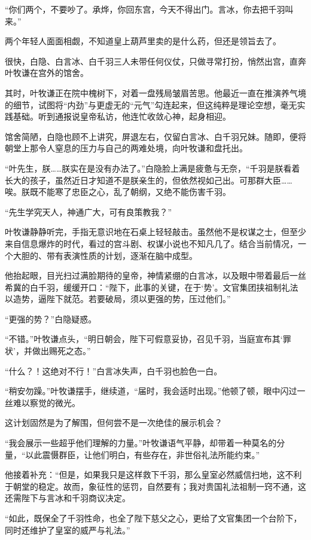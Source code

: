 “你们两个，不要吵了。承烨，你回东宫，今天不得出门。言冰，你去把千羽叫来。”

两个年轻人面面相觑，不知道皇上葫芦里卖的是什么药，但还是领旨去了。

很快，白隐、白言冰、白千羽三人未带任何仪仗，只做寻常打扮，悄然出宫，直奔叶牧谦在宫外的馆舍。

其时，叶牧谦正在院中槐树下，对着一盘残局皱眉苦思。他最近一直在推演养气境的细节，试图将“内劲”与更虚无的“元气”勾连起来，但这纯粹是理论空想，毫无实践基础。听到通报说皇帝私访，他连忙收敛心神，起身相迎。

馆舍简陋，白隐也顾不上讲究，屏退左右，仅留白言冰、白千羽兄妹。随即，便将朝堂上那令人窒息的压力与自己的两难处境，向叶牧谦和盘托出。

“叶先生，朕……朕实在是没有办法了。”白隐脸上满是疲惫与无奈，“千羽是朕看着长大的孩子，虽然近日才知道不是朕亲生的，但依然视如己出。可那群大臣……唉。朕既不能寒了忠臣之心，乱了朝纲，又绝不能伤害千羽。

“先生学究天人，神通广大，可有良策教我？”

叶牧谦静静听完，手指无意识地在石桌上轻轻敲击。虽然他不是权谋之士，但至少来自信息爆炸的时代，看过的宫斗剧、权谋小说也不知凡几了。结合当前情况，一个大胆的、带有表演性质的计划，逐渐在脑中成型。

他抬起眼，目光扫过满脸期待的皇帝，神情紧绷的白言冰，以及眼中带着最后一丝希冀的白千羽，缓缓开口：“陛下，此事的关键，在于‘势’。文官集团挟祖制礼法以造势，逼陛下就范。若要破局，须以更强的势，压过他们。”

“更强的势？”白隐疑惑。

“不错。”叶牧谦点头，“明日朝会，陛下可假意妥协，召见千羽，当庭宣布其‘罪状’，并做出赐死之态。”

“什么？！这绝对不行！”白言冰失声，白千羽也脸色一白。

“稍安勿躁。”叶牧谦摆手，继续道，“届时，我会适时出现。”他顿了顿，眼中闪过一丝难以察觉的微光。

这计划固然是为了解围，但何尝不是一次绝佳的展示机会？

“我会展示一些超乎他们理解的力量。”叶牧谦语气平静，却带着一种莫名的分量，“以此震慑群臣，让他们明白，有些存在，非世俗礼法所能约束。”

他接着补充：“但是，如果我只是这样救下千羽，那么皇室必然威信扫地，这不利于朝堂的稳定。故而，象征性的惩罚，自然要有；我对贵国礼法祖制一窍不通，这还需陛下与言冰和千羽商议决定。

“如此，既保全了千羽性命，也全了陛下慈父之心，更给了文官集团一个台阶下，同时还维护了皇室的威严与礼法。”

